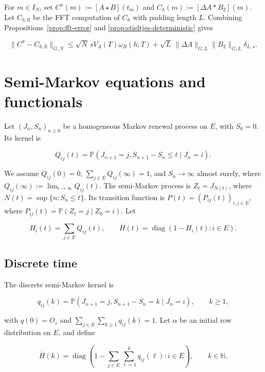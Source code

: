 \documentclass[3p,12pt,authoryear]{elsarticle}
\theoremstyle{definition}
\theoremstyle{remark}
\newcommand{\N}{\mathbb N}
\newcommand{\fl}{\mathrm{fl}}
\newcommand{\diag}{\operatorname{diag}}
\begin{document}
For $m\in I_N$, set $C^{\pi}(m):=[A\star B](t_m)$ and $C_h(m):=[\Delta A*B_2](m)$. Let $C_{h,\fl}$ be the FFT computation of $C_h$ with padding length $L$. Combining Propositions~\ref{prop:fft-error} and \ref{prop:stieltjes-deterministic} gives

\begin{equation}\label{eq:stieltjes-total-error}
\|C^{\pi}-C_{h,\fl}\|_{G,N}
\leq
\sqrt N\,sV_A(T)\omega_B(h;T)
+
\sqrt L\,\|\Delta A\|_{G,L}\|B_2\|_{G,L}\delta_{L,s}.
\end{equation}

\section{Semi-Markov equations and functionals}\label{sec:semimarkov}

Let $(J_n,S_n)_{n\geq0}$ be a homogeneous Markov renewal process on $E$, with $S_0=0$. Its kernel is

\begin{equation*}
Q_{ij}(t)
=
\mathbb P(J_{n+1}=j,S_{n+1}-S_n\leq t\mid J_n=i).
\end{equation*}

We assume $Q_{ij}(0)=0$, $\sum_{j\in E}Q_{ij}(\infty)=1$, and $S_n\to\infty$ almost surely, where $Q_{ij}(\infty):=\lim_{t\to\infty}Q_{ij}(t)$. The semi-Markov process is $Z_t=J_{N(t)}$, where $N(t)=\sup\{n:S_n\leq t\}$. Its transition function is $P(t)=(P_{ij}(t))_{i,j\in E}$, where $P_{ij}(t)=\mathbb P(Z_t=j\mid Z_0=i)$. Let

\begin{equation*}
H_i(t)=\sum_{j\in E}Q_{ij}(t),
\qquad
\overline H(t)=\diag(1-H_i(t):i\in E).
\end{equation*}


\subsection{Discrete time}

The discrete semi-Markov kernel is

\begin{equation*}
q_{ij}(k)
=
\mathbb P(J_{n+1}=j,S_{n+1}-S_n=k\mid J_n=i),
\qquad k\geq1,
\end{equation*}

with $q(0)=O_s$ and $\sum_{j\in E}\sum_{k\geq1}q_{ij}(k)=1$. Let $\alpha$ be an initial row distribution on $E$, and define

\begin{equation*}
\overline H(k)
=
\diag\left(1-\sum_{j\in E}\sum_{\ell=1}^{k}q_{ij}(\ell):i\in E\right),
\qquad k\in\N.
\end{equation*}
\end{document}
